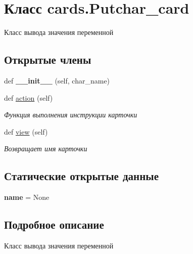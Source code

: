 \hypertarget{classcards_1_1_putchar__card}{}\section{Класс cards.\+Putchar\+\_\+card}
\label{classcards_1_1_putchar__card}


Класс вывода значения переменной  


\subsection*{Открытые члены}
\begin{DoxyCompactItemize}
\item 
\mbox{\label{classcards_1_1_putchar__card_a09810a2e76a3d310fe24933e7f9b8bd7}} 
def {\bfseries \+\_\+\+\_\+init\+\_\+\+\_\+} (self, char\+\_\+name)
\item 
def \mbox{\hyperlink{classcards_1_1_putchar__card_a38fd4a6f472b122e8450a5cd18939797}{action}} (self)
\begin{DoxyCompactList}\small\item\em Функция выполнения инструкции карточки \end{DoxyCompactList}\item 
def \mbox{\hyperlink{classcards_1_1_putchar__card_aada8fcd8665a53606210e983a3eb1e2d}{view}} (self)
\begin{DoxyCompactList}\small\item\em Возвращает имя карточки \end{DoxyCompactList}\end{DoxyCompactItemize}
\subsection*{Статические открытые данные}
\begin{DoxyCompactItemize}
\item 
\mbox{\label{classcards_1_1_putchar__card_a30161c5f14441952842e73cde0ee4616}} 
{\bfseries name} = None
\end{DoxyCompactItemize}


\subsection{Подробное описание}
Класс вывода значения переменной 


